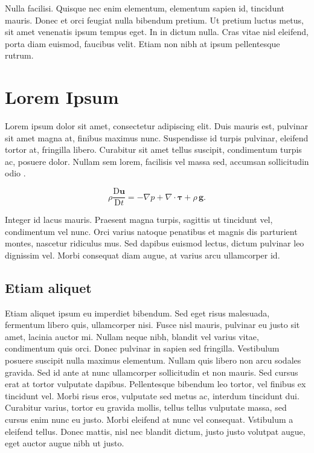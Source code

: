 \documentclass{luagost-7-32}
\begin{document}
Nulla facilisi.
Quisque nec enim elementum, elementum sapien id, tincidunt mauris.
Donec et orci feugiat nulla bibendum pretium.
Ut pretium luctus metus, sit amet venenatis ipsum tempus eget.
In in dictum nulla.
Cras vitae nisl eleifend, porta diam euismod, faucibus velit.
Etiam non nibh at ipsum pellentesque rutrum.

\newpage
\section{Lorem Ipsum}

Lorem ipsum dolor sit amet, consectetur adipiscing elit.
Duis mauris est, pulvinar sit amet magna at, finibus maximus nunc.
Suspendisse id turpis pulvinar, eleifend tortor at, fringilla libero.
Curabitur sit amet tellus suscipit, condimentum turpis ac, posuere dolor.
Nullam sem lorem, facilisis vel massa sed, accumsan sollicitudin odio \cite{bib:knuth}.

\begin{equation}
    \rho\frac{\mathrm{D} \mathbf{u}}{\mathrm{D} t} = - \nabla p + \nabla \cdot \boldsymbol \tau + \rho\,\mathbf{g}.
\end{equation}

Integer id lacus mauris.
Praesent magna turpis, sagittis ut tincidunt vel, condimentum vel nunc.
Orci varius natoque penatibus et magnis dis parturient montes, nascetur ridiculus mus.
Sed dapibus euismod lectus, dictum pulvinar leo dignissim vel.
Morbi consequat diam augue, at varius arcu ullamcorper id.

\subsection{Etiam aliquet}

Etiam aliquet ipsum eu imperdiet bibendum.
Sed eget risus malesuada, fermentum libero quis, ullamcorper nisi.
Fusce nisl mauris, pulvinar eu justo sit amet, lacinia auctor mi.
Nullam neque nibh, blandit vel varius vitae, condimentum quis orci.
Donec pulvinar in sapien sed fringilla.
Vestibulum posuere suscipit nulla maximus elementum.
Nullam quis libero non arcu sodales gravida.
Sed id ante at nunc ullamcorper sollicitudin et non mauris.
Sed cursus erat at tortor vulputate dapibus.
Pellentesque bibendum leo tortor, vel finibus ex tincidunt vel.
Morbi risus eros, vulputate sed metus ac, interdum tincidunt dui.
Curabitur varius, tortor eu gravida mollis, tellus tellus vulputate massa, sed cursus enim nunc eu justo.
Morbi eleifend at nunc vel consequat.
Vstibulum a eleifend tellus.
Donec mattis, nisl nec blandit dictum, justo justo volutpat augue, eget auctor augue nibh ut justo.
\end{document}
